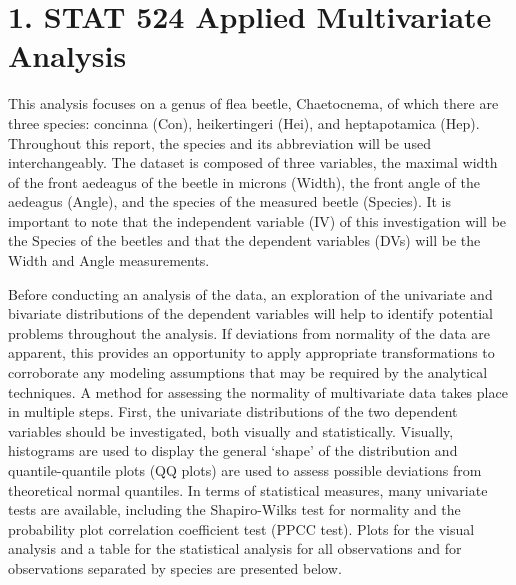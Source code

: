


\maketitle

\section*{1. STAT 524 Applied Multivariate Analysis} 

\indent

	This analysis focuses on a genus of flea beetle, Chaetocnema, of which there are three species: concinna (Con), heikertingeri (Hei), and heptapotamica (Hep). Throughout this report, the species and its abbreviation will be used interchangeably. The dataset is composed of three variables, the maximal width of the front aedeagus of the beetle in microns (Width), the front angle of the aedeagus (Angle), and the species of the measured beetle (Species). It is important to note that the independent variable (IV) of this investigation will be the Species of the beetles and that the dependent variables (DVs) will be the Width and Angle measurements.

	Before conducting an analysis of the data, an exploration of the univariate and bivariate distributions of the dependent variables will help to identify potential problems throughout the analysis. If deviations from normality of the data are apparent, this provides an opportunity to apply appropriate transformations to corroborate any modeling assumptions that may be required by the analytical techniques. A method for assessing the normality of multivariate data takes place in multiple steps. First, the univariate distributions of the two dependent variables should be investigated, both visually and statistically. Visually, histograms are used to display the general `shape' of the distribution and quantile-quantile plots (QQ plots) are used to assess possible deviations from theoretical normal quantiles. In terms of statistical measures, many univariate tests are available, including the Shapiro-Wilks test for normality and the probability plot correlation coefficient test (PPCC test). Plots for the visual analysis and a table for the statistical analysis for all observations and for observations separated by species are presented below.

